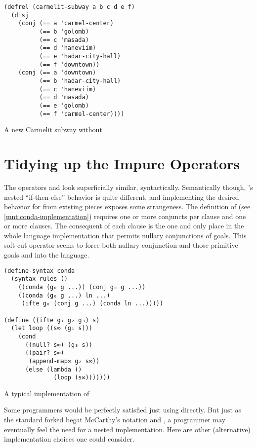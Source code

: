 \documentclass[sigplan,draft,balance,pbalance,natbib=false]{acmart}
\begin{document}
\begin{listing}
  \begin{verbatim}
(defrel (carmelit-subway a b c d e f)
  (disj
    (conj (== a 'carmel-center)
          (== b 'golomb)
          (== c 'masada)
          (== d 'haneviim)
          (== e 'hadar-city-hall)
          (== f 'downtown))
    (conj (== a 'downtown)
          (== b 'hadar-city-hall)
          (== c 'haneviim)
          (== d 'masada)
          (== e 'golomb)
          (== f 'carmel-center))))
  \end{verbatim}
  \caption{A new Carmelit subway without }
  \label{mnt:new-carmelit}
\end{listing}

\section{Tidying up the Impure Operators}\label{sec:impure}

The operators  and  look
superficially similar, syntactically. Semantically though,
's nested \enquote{if-then-else} behavior is quite
different, and implementing the desired behavior for
 from existing pieces exposes some strangeness. The
definition of  (see \cref{mnt:conda-implementation})
requires one or more conjuncts per clause and one or more clauses. The
consequent of each  clause is the one and only place
in the whole language implementation that permits nullary conjunctions
of goals. This soft-cut operator seems to force both nullary
conjunction and those primitive goals  and
 into the language.

\begin{listing}
  \begin{verbatim}
(define-syntax conda
  (syntax-rules ()
    ((conda (g₀ g ...)) (conj g₀ g ...))
    ((conda (g₀ g ...) ln ...)
     (ifte g₀ (conj g ...) (conda ln ...)))))

(define ((ifte g₁ g₂ g₃) s)
  (let loop ((s∞ (g₁ s)))
    (cond
      ((null? s∞) (g₃ s))
      ((pair? s∞)
       (append-map∞ g₂ s∞))
      (else (lambda ()
              (loop (s∞)))))))
  \end{verbatim}
  \caption{A typical implementation of }
  \label{mnt:conda-implementation}
\end{listing}

Some programmers would be perfectly satisfied just using
 directly. But just as the standard forked
 begat McCarthy's  notation and
, a programmer may eventually feel the need for a
nested implementation. Here are other (alternative) implementation
choices one could consider.
\end{document}
